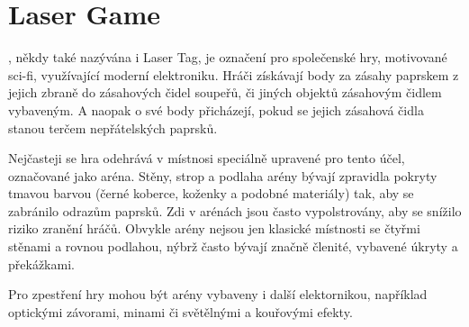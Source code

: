 \section{Laser Game}

, někdy také nazývána i Laser Tag, je označení pro společenské hry, motivované sci-fi, využívající moderní elektroniku. Hráči získávají body za zásahy  paprskem z jejich zbraně do zásahových čidel soupeřů, či jiných objektů zásahovým čidlem vybaveným. A naopak o své body přicházejí, pokud se jejich zásahová čidla stanou terčem nepřátelských  paprsků.

Nejčasteji se hra odehrává v místnosi speciálně upravené pro tento účel, označované jako aréna. Stěny, strop a podlaha arény bývají zpravidla pokryty tmavou barvou (černé koberce, koženky a podobné materiály) tak, aby se zabránilo odrazům  paprsků. Zdi v arénách jsou často vypolstrovány, aby se snížilo riziko zranění hráčů. Obvykle arény nejsou jen klasické místnosti se čtyřmi stěnami a rovnou podlahou, nýbrž často bývají značně členité, vybavené úkryty a překážkami.

Pro zpestření hry mohou být arény vybaveny i další elektornikou, například optickými závorami, minami či světělnými a kouřovými efekty.
